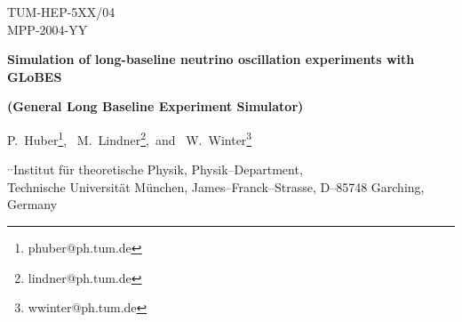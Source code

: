 \documentclass[12pt,a4paper]{article}
\begin{document}

\begin{titlepage}

\renewcommand{\thefootnote}{\alph{footnote}}

\vspace*{-3.cm}
\begin{flushright}
TUM-HEP-5XX/04\\
MPP-2004-YY\\
\end{flushright}

\vspace*{0.5cm}

\renewcommand{\thefootnote}{\fnsymbol{footnote}}
\setcounter{footnote}{-1}

{\begin{center}
{\Large\bf Simulation of long-baseline neutrino oscillation
experiments with GLoBES}
\end{center}}
{\begin{center}
{\large\bf (General Long Baseline Experiment Simulator)}
\end{center}}
\renewcommand{\thefootnote}{\alph{footnote}}

\vspace*{.8cm}
{\begin{center} {\large{\sc
                P.~Huber\footnote[1]{
                phuber@ph.tum.de},~
                M.~Lindner\footnote[2]{
                lindner@ph.tum.de},~and~
                W.~Winter\footnote[5]{
                wwinter@ph.tum.de}
                }}
\end{center}}
\vspace*{0cm}
{\it
\begin{center}

\footnotemark[1]${}^,$\footnotemark[2]${}^,$\footnotemark[3]%
       Institut f\"ur theoretische Physik, Physik--Department,\\
       Technische Universit\"at M\"unchen,
       James--Franck--Strasse, D--85748 Garching, Germany


\end{center}}


\end{titlepage}
\end{document}
